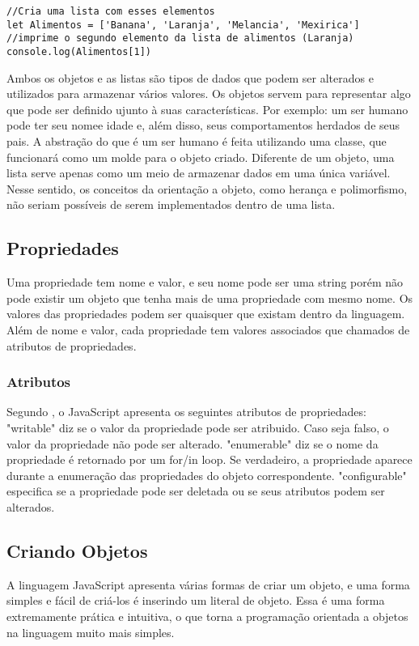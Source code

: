 \begin{lstlisting}
//Cria uma lista com esses elementos
let Alimentos = ['Banana', 'Laranja', 'Melancia', 'Mexirica']  
//imprime o segundo elemento da lista de alimentos (Laranja) 
console.log(Alimentos[1])  
\end{lstlisting}

Ambos os objetos e as listas são tipos de dados que podem ser alterados e utilizados para armazenar vários valores. Os objetos servem para representar algo que pode ser definido ujunto à suas características. Por exemplo: um ser humano pode ter seu nomee idade e, além disso, seus comportamentos herdados de seus pais. A abstração do que é um ser humano é feita utilizando uma classe, que funcionará como um molde para o objeto criado. \newline
Diferente de um objeto, uma lista serve apenas como um meio de armazenar dados em uma única variável. Nesse sentido, os conceitos da orientação a objeto, como herança e polimorfismo, não seriam possíveis de serem implementados dentro de uma lista.

\subsection{Propriedades}
	Uma propriedade tem nome e valor, e seu nome pode ser uma string porém não pode existir um objeto que tenha mais de uma propriedade com mesmo nome. Os valores das propriedades podem ser quaisquer que existam dentro da linguagem. \newline
	Além de nome e valor, cada propriedade tem valores associados que chamados de atributos de propriedades. 
	
	\subsubsection{Atributos}
	Segundo \cite{flanagan2020javascript}, o JavaScript apresenta os seguintes atributos de propriedades:
	"writable" diz se o valor da propriedade pode ser atribuido. Caso seja falso, o valor da propriedade não pode ser alterado.
	"enumerable" diz se o nome da propriedade é retornado por um for/in loop. Se verdadeiro, a propriedade aparece durante a enumeração das propriedades do objeto correspondente. 
	"configurable" especifica se a propriedade pode ser deletada ou se seus atributos podem ser alterados.
\subsection{Criando Objetos}
	A linguagem JavaScript apresenta várias formas de criar um objeto, e uma forma simples e fácil de criá-los é inserindo um literal de objeto. Essa é uma forma extremamente prática e intuitiva, o que torna a programação orientada a objetos na linguagem muito mais simples. \newline

